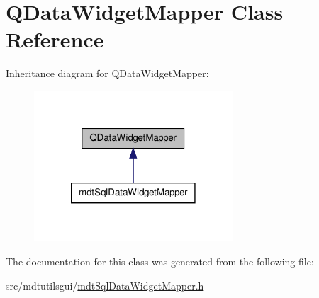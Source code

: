 \hypertarget{class_q_data_widget_mapper}{\section{Q\-Data\-Widget\-Mapper Class Reference}
\label{class_q_data_widget_mapper}
}


Inheritance diagram for Q\-Data\-Widget\-Mapper\-:
\nopagebreak
\begin{figure}[H]
\begin{center}
\leavevmode
\includegraphics[width=210pt]{class_q_data_widget_mapper__inherit__graph}
\end{center}
\end{figure}


The documentation for this class was generated from the following file\-:\begin{DoxyCompactItemize}
\item 
src/mdtutilsgui/\hyperlink{mdt_sql_data_widget_mapper_8h}{mdt\-Sql\-Data\-Widget\-Mapper.\-h}\end{DoxyCompactItemize}
